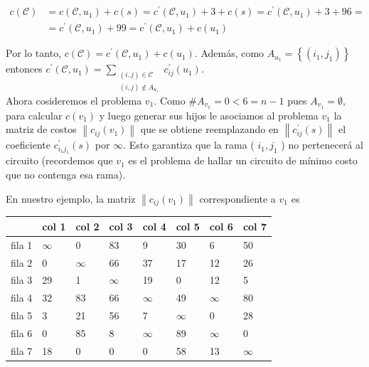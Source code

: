 \documentclass[10pt]{article}
\begin{document}
$$
\begin{aligned}
c(\mathcal{C}) & =c\left(\mathcal{C}, u_{1}\right)+c(s)=c^{\prime}\left(\mathcal{C}, u_{1}\right)+3+c(s)=c^{\prime}\left(\mathcal{C}, u_{1}\right)+3+96= \\
& =c^{\prime}\left(\mathcal{C}, u_{1}\right)+99=c^{\prime}\left(\mathcal{C}, u_{1}\right)+c\left(u_{1}\right)
\end{aligned}
$$

Por lo tanto, $c(\mathcal{C})=c^{\prime}\left(\mathcal{C}, u_{1}\right)+c\left(u_{1}\right)$. Además, como $A_{u_{1}}=\left\{\left(i_{1}, j_{1}\right)\right\}$ entonces $c^{\prime}\left(\mathcal{C}, u_{1}\right)=\sum_{\substack{(i, j) \in \mathcal{C} \\(i, j) \notin A_{u_{1}}}} c_{i j}^{\prime}\left(u_{1}\right)$.\\
Ahora cosideremos el problema $v_{1}$. Como $\# A_{v_{1}}=0<6=n-1$ pues $A_{v_{1}}=\emptyset$, para calcular $c\left(v_{1}\right)$ y luego generar sus hijos le asociamos al problema $v_{1}$ la matriz de costos $\left\|c_{i j}\left(v_{1}\right)\right\|$ que se obtiene reemplazando en $\left\|c_{i j}^{\prime}(s)\right\|$ el coeficiente $c_{i_{1} j_{1}}^{\prime}(s)$ por $\infty$. Esto garantiza que la rama ( $i_{1}, j_{1}$ ) no pertenecerá al circuito (recordemos que $v_{1}$ es el problema de hallar un circuito de mínimo costo que no contenga esa rama).

En nuestro ejemplo, la matriz $\left\|c_{i j}\left(v_{1}\right)\right\|$ correspondiente a $v_{1}$ es

\begin{center}
\begin{tabular}{|l|l|l|l|l|l|l|l|}
\hline
 & col 1 & col 2 & col 3 & col 4 & col 5 & col 6 & col 7 \\
\hline
fila 1 & $\infty$ & 0 & 83 & 9 & 30 & 6 & 50 \\
\hline
fila 2 & 0 & $\infty$ & 66 & 37 & 17 & 12 & 26 \\
\hline
fila 3 & 29 & 1 & $\infty$ & 19 & 0 & 12 & 5 \\
\hline
fila 4 & 32 & 83 & 66 & $\infty$ & 49 & $\infty$ & 80 \\
\hline
fila 5 & 3 & 21 & 56 & 7 & $\infty$ & 0 & 28 \\
\hline
fila 6 & 0 & 85 & 8 & $\infty$ & 89 & $\infty$ & 0 \\
\hline
fila 7 & 18 & 0 & 0 & 0 & 58 & 13 & $\infty$ \\
\hline
\end{tabular}
\end{center}
\end{document}
